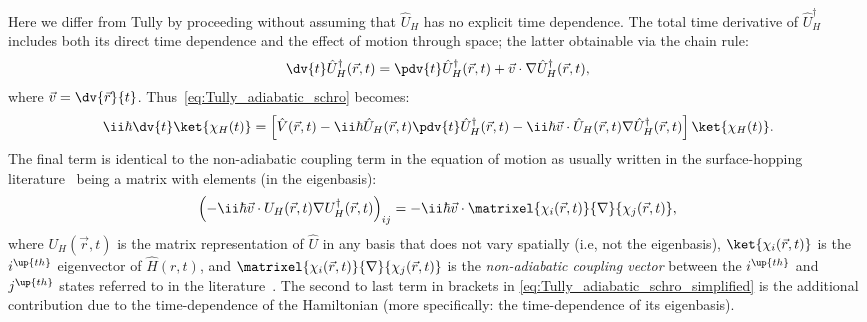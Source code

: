 Here we differ from Tully by proceeding without assuming that $\hat U_H$ has no explicit time dependence. The total time derivative of $\hat U_H^\dagger$ includes both its direct time dependence and the effect of motion through space; the latter obtainable via the chain rule:
\begin{align}
\dv{t}\hat U^\dagger_H(\vec r, t)
 = \pdv{t} \hat U^\dagger_H(\vec r, t) + \vec v\cdot \nabla \hat U^\dagger_H(\vec r, t),
\end{align}
where $\vec v = \dv{\vec r}{t}$. Thus~\eqref{eq:Tully_adiabatic_schro} becomes:
\begin{align}\label{eq:Tully_adiabatic_schro_simplified}
\ii\hbar\dv{t}\ket{\chi_H(t)} = \left[
  \hat V(\vec r, t)
  - \ii\hbar\hat U_H(\vec r, t)\pdv{t} \hat U^\dagger_H(\vec r, t)
   - \ii\hbar\vec v\cdot \hat U_H(\vec r, t)\nabla \hat U^\dagger_H(\vec r, t)
 \right]\ket{\chi_H(t)}.
\end{align}
The final term is identical to the non-adiabatic coupling term in the equation of motion as usually written in the surface-hopping literature~\cite{doi:10.1146/annurev-physchem-040215-112245} being a matrix with elements (in the eigenbasis):
\begin{align}
\left(- \ii\hbar\vec v\cdot U_H(\vec r, t)\nabla U^\dagger_H(\vec r, t)\right)_{ij}
= - \ii\hbar\vec v\cdot\matrixel{\chi_i(\vec r, t)}{\nabla}{\chi_j (\vec r, t)},
\end{align}
where $U_H(\vec r, t)$ is the matrix representation of $\hat U$ in any basis that does not vary spatially (i.e, not the eigenbasis), $\ket{\chi_i(\vec r, t)}$ is the $i^\up{th}$ eigenvector of $\hat H(r, t)$, and $\matrixel{\chi_i(\vec r, t)}{\nabla}{\chi_j (\vec r, t)}$ is the \emph{non-adiabatic coupling vector} between the $i^\up{th}$ and $j^\up{th}$ states referred to in the literature~\cite{doi:10.1146/annurev-physchem-040215-112245}. The second to last term in brackets in \eqref{eq:Tully_adiabatic_schro_simplified}
is the additional contribution due to the time-dependence of the Hamiltonian (more specifically: the time-dependence of its eigenbasis).

